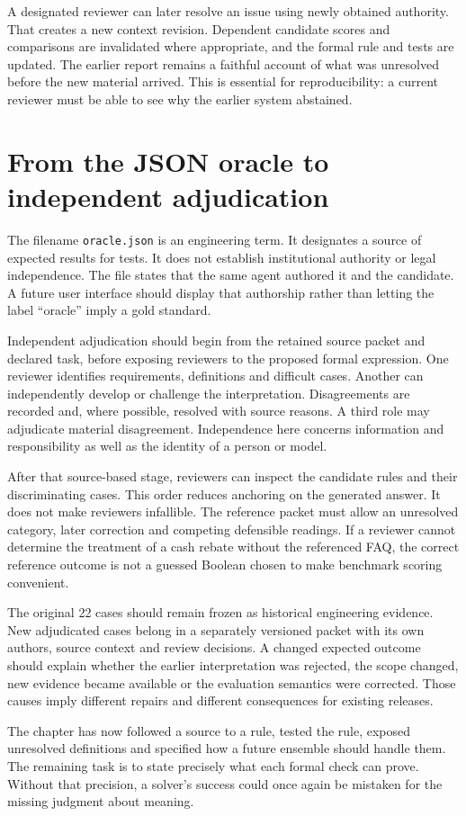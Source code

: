 A designated reviewer can later resolve an issue using newly obtained authority.
That creates a new context revision. Dependent candidate scores and comparisons
are invalidated where appropriate, and the formal rule and tests are updated.
The earlier report remains a faithful account of what was unresolved before the
new material arrived. This is essential for reproducibility: a current reviewer
must be able to see why the earlier system abstained.

\section{From the JSON oracle to independent adjudication}
\label{sec:circular-independent}
The filename \texttt{oracle.json} is an engineering term. It designates a source
of expected results for tests. It does not establish institutional authority or
legal independence. The file states that the same agent authored it and the
candidate. A future user interface should display that authorship rather than
letting the label ``oracle'' imply a gold standard.

Independent adjudication should begin from the retained source packet and
declared task, before exposing reviewers to the proposed formal expression.
One reviewer identifies requirements, definitions and difficult cases. Another
can independently develop or challenge the interpretation. Disagreements are
recorded and, where possible, resolved with source reasons. A third role may
adjudicate material disagreement. Independence here concerns information and
responsibility as well as the identity of a person or model.

After that source-based stage, reviewers can inspect the candidate rules and
their discriminating cases. This order reduces anchoring on the generated
answer. It does not make reviewers infallible. The reference packet must allow
an unresolved category, later correction and competing defensible readings.
If a reviewer cannot determine the treatment of a cash rebate without the
referenced FAQ, the correct reference outcome is not a guessed Boolean chosen
to make benchmark scoring convenient.

The original 22 cases should remain frozen as historical engineering evidence.
New adjudicated cases belong in a separately versioned packet with its own
authors, source context and review decisions. A changed expected outcome should
explain whether the earlier interpretation was rejected, the scope changed,
new evidence became available or the evaluation semantics were corrected.
Those causes imply different repairs and different consequences for existing
releases.

The chapter has now followed a source to a rule, tested the rule, exposed
unresolved definitions and specified how a future ensemble should handle them.
The remaining task is to state precisely what each formal check can prove.
Without that precision, a solver's success could once again be mistaken for
the missing judgment about meaning.
